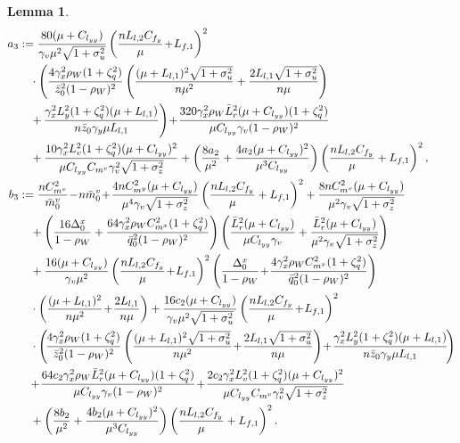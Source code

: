\documentclass{article}
\theoremstyle{plain}
\newtheorem{lemma}[lemma]{Lemma}
\theoremstyle{definition}
\theoremstyle{remark}
\begin{document}
\begin{lemma}
\begin{align}
a_3 &:=\frac{80(\mu + C_{l_{yy}})}{\gamma_v\mu^2\sqrt{1+\sigma_u^2}}\left(\frac{nL_{l,2}C_{f_y}}{\mu}\!+\!L_{f,1}\right)^2\nonumber\\
&\quad\cdot\left(\frac{4 \gamma_x^2 \rho_W (1 + \zeta_q^2)}{\bar{z}_0^2(1 - \rho_W)^2} \left(\frac{(\mu+L_{l,1})^2\sqrt{1+\sigma_u^2}}{n\mu^2 }+\frac{2L_{l,1}\sqrt{1+\sigma_u^2}}{n\mu }\right)\right.\nonumber\\
&\quad +\!\left.\frac{\gamma_x^2L_y^2(1+\zeta_q^2)(\mu + L_{l,1})}{n\bar{z}_0\gamma_y \mu L_{l,1}}\right) \!+\! \frac{320\gamma_x^2 \rho_W \bar{L}_r^2(\mu + C_{l_{yy}})(1 + \zeta_q^2)}{\mu C_{l_{yy}}\gamma_v(1 - \rho_W)^2} \notag \\
&\quad  + \frac{10\gamma_x^2L_v^2(1+\zeta_q^2)(\mu + C_{l_{yy}})^2}{\mu C_{l_{yy}}C_{m^v}\gamma_v^2\sqrt{1+\sigma_z^2}}+ \left(\frac{8a_2}{\mu^2}+\frac{4a_2(\mu + C_{l_{yy}})^2}{\mu^3 C_{l_{yy}}} \right)\left(\frac{nL_{l,2}C_{f_y}}{\mu}+L_{f,1}\right)^2,  \notag\\
b_3 &:=\frac{nC_{m^v}^2}{\bar{m}^v_{0}}\! -\! n\bar{m}^v_{0} \!+\! \frac{4nC_{m^y}^2(\mu + C_{l_{yy}})}{\mu^4\gamma_v\sqrt{1+\sigma_z^2}}\left(\frac{nL_{l,2}C_{f_y}}{\mu}+L_{f,1}\right)^2 + \frac{8nC_{m^v}^2(\mu + C_{l_{yy}})}{\mu^2\gamma_v\sqrt{1+\sigma_z^2}}\notag \\ 
&\quad +\left(\frac{16\Delta_0^x}{1-\rho_W}+\frac{64\gamma_x^2\rho_WC_{m^x}^2(1+\zeta_q^2)}{\bar{q}_0^2(1-\rho_W)^2}\right)\left(\frac{ \bar{L}_r^2(\mu + C_{l_{yy}})}{\mu C_{l_{yy}}\gamma_v}+\frac{\bar{L}_r^2(\mu+C_{l_{yy}})}{\mu^2\gamma_v\sqrt{1+\sigma_z^2}}\right)\nonumber\\
&\quad + \frac{16(\mu + C_{l_{yy}})}{\gamma_v\mu^2}\left(\frac{nL_{l,2}C_{f_y}}{\mu}\!+\!L_{f,1}\right)^2 \left(\frac{\Delta_0^x}{1-\rho_W}\!+\!\frac{4 \gamma_x^2 \rho_WC_{m^x}^2 (1 + \zeta_q^2)}{\bar{q}_0^2(1 - \rho_W)^2} \right)\notag\\
&\quad\cdot\left(\frac{(\mu+L_{l,1})^2}{n\mu^2 }\!+\!\frac{2L_{l,1}}{n\mu }\right)+\frac{16c_2(\mu + C_{l_{yy}})}{\gamma_v\mu^2\sqrt{1+\sigma_u^2}}\left(\frac{nL_{l,2}C_{f_y}}{\mu}\!+\!L_{f,1}\right)^2\notag \\
&\quad \cdot\left(\!\frac{4 \gamma_x^2 \rho_W (1 + \zeta_q^2)}{\bar{z}_0^2(1 - \rho_W)^2} \left(\frac{(\mu+L_{l,1})^2\sqrt{1+\sigma_u^2}}{n\mu^2 }\!+\!\frac{2L_{l,1}\sqrt{1+\sigma_u^2}}{n\mu }\right)\!+\!\frac{\gamma_x^2L_y^2(1+\zeta_q^2)(\mu + L_{l,1})}{n\bar{z}_0\gamma_y \mu L_{l,1}}\!\right) \nonumber\\
&\quad \!+\! \frac{64 c_2\gamma_x^2 \rho_W \bar{L}_r^2(\mu + C_{l_{yy}})(1 + \zeta_q^2)}{\mu C_{l_{yy}}\gamma_v(1 - \rho_W)^2} \!+\! \frac{2c_2\gamma_x^2L_v^2(1+\zeta_q^2)(\mu + C_{l_{yy}})^2}{\mu C_{l_{yy}}C_{m^v}\gamma_v^2\sqrt{1+\sigma_z^2}} \notag \\
&\quad  + \left(\frac{8b_2}{\mu^2}+\frac{4b_2(\mu + C_{l_{yy}})^2}{\mu^3 C_{l_{yy}}} \right)\left(\frac{nL_{l,2}C_{f_y}}{\mu}+L_{f,1}\right)^2  .\label{eq106}
\end{align}
\end{lemma}
\end{document}
